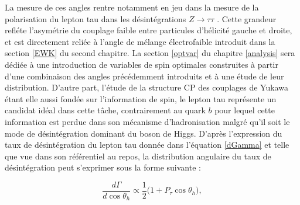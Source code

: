 La mesure de ces angles rentre notamment en jeu dans la mesure de la polarisation du lepton tau dans les désintégrations $Z\rightarrow\tau\tau$ \cite{Zpol}. Cette grandeur refléte l'asymétrie du couplage faible entre particules d'hélicité gauche et droite, et est directement reliée à l'angle de mélange électrofaible introduit dans la section \ref{EWK} du second chapitre. La section \ref{optvar} du chapitre \ref{analysis} sera dédiée à une introduction de variables de spin optimales construites à partir d'une combinaison des angles précédemment introduits et à une étude de leur distribution. D'autre part, l'étude de la structure CP des couplages de Yukawa étant elle aussi fondée sur l'information de spin, le lepton tau représente un candidat idéal dans cette tâche, contrairement au quark $b$ pour lequel cette information est perdue dans son mécanisme d'hadronisation malgré qu'il soit le mode de désintégration dominant du boson de Higgs.
D'après l'expression du taux de désintégration du lepton tau donnée dans l'équation \ref{dGamma} et telle que vue dans son référentiel au repos, la distribution angulaire du taux de désintégration peut s'exprimer sous la forme suivante :

\begin{equation}
    \frac{d\Gamma}{d\cos\theta_h}\propto\frac{1}{2}\bigl(1+P_{\tau}\cos\theta_h\bigr),
\end{equation}

